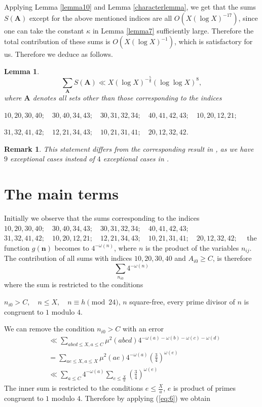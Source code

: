 \documentclass[11pt]{article}
\newcommand{\n}{\textbf{n}}
\newcommand{\A}{ \textbf{A} }
\newtheorem{lemma}[theorem]{Lemma}
\newtheorem{remark}[theorem]{Remark}
\begin{document}
\noindent Applying Lemma \ref{lemma10} and Lemma
\ref{characterlemma}, we get that the sums $S(\A)$ except for the above mentioned indices are all $O(X(\log X)^{-17})$, since one can take the constant $\kappa$ in Lemma \ref{lemma7} sufficiently large. Therefore the total contribution of these sums is $O(X(\log X)^{-1})$, which is satisfactory for us. Therefore we deduce as follows.
\begin{lemma}\label{lemma11}
$$\sum\limits_{\A}S(\A)\ll X(\log X)^{-\frac{5}{8}}(\log \log X)^{8},$$
where $\A$ denotes all sets other than those corresponding to the indices
\begin{center}
$10,20,30,40;\quad 30,40,34,43;\quad 30,31,32,34;\quad 40,41,42,43;\quad 10,20,12,21;$
\end{center}
\begin{center}
$31,32,41,42;\quad 12,21,34,43;\quad 10,21,31,41;\quad 20,12,32,42$.
\end{center}
\end{lemma}
\begin{remark}
 This statement differs from the corresponding result in \cite{HeathBrown}, as we have $9$ exceptional cases instead of $4$ exceptional cases in \cite{HeathBrown}.    
\end{remark}
\section{The main terms}\label{sec:6}
\noindent Initially we observe that the sums corresponding to the indices $10,20,30,40;\quad 30,40,34,43;\quad 30,31,32,34;\quad 40,41,42,43;$ $31,32,41,42;\quad 10,20,12,21;\quad 12,21,34,43;\quad 10,21,31,41;\quad 20,12,32,42;\quad$  the function $g(\n)$ becomes to $4^{-\omega(n)}$, where $n$ is the product of the variables $n_{ij}$. The contribution of all sums with indices $10,20,30,40$ and $A_{i0}\geq C$, is therefore 
$$\sum\limits_{n_{i0}}4^{-\omega(n)}$$
where the sum is restricted to the conditions
\begin{center}
$n_{i0}>C,\quad n\leq X,\quad n\equiv h\pmod{24}$, $n$ square-free, every prime divisor of $n$ is congruent to $1$ modulo $4$.
\end{center}
We can remove the condition $n_{i0}>C$ with an error
\begin{align*}
&\ll \sum\limits_{abcd\leq X,a\leq C}\mu^{2}(abcd)4^{-\omega(a)-\omega(b)-\omega(c)-\omega(d)}\\
&=\sum\limits_{ae\leq X,a\leq X}\mu^{2}(ae)4^{-\omega(a)}(\frac{3}{4})^{\omega(e)}\\
&\ll \sum\limits_{a\leq C}4^{-\omega(a)}\sum\limits_{e\leq \frac{X}{a}}(\frac{3}{4})^{\omega(e)}
\end{align*}
The inner sum is restricted to the conditions $e\leq \frac{X}{a}$,
$e$ is product of primes congruent to $1$ modulo $4$. Therefore by applying (\ref{eq:6}) we obtain
\end{document}
